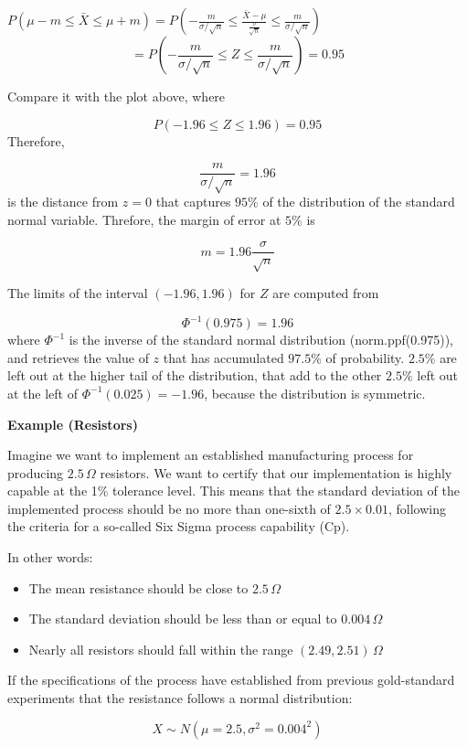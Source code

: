 \documentclass[
]{book}
\providecommand{\tightlist}{%
  \setlength{\itemsep}{0pt}\setlength{\parskip}{0pt}}
\begin{document}
\(P(\mu-m \leq \bar{X} \leq\mu + m)=P(-\frac{m}{\sigma/\sqrt{n}} \leq \frac{\bar{X}-\mu}{\frac{\sigma}{\sqrt{n}}}\leq\frac{m}{\sigma/\sqrt{n}})\)
\[=P(-\frac{m}{\sigma/\sqrt{n}} \leq Z \leq\frac{m}{\sigma/\sqrt{n}})=0.95\]

Compare it with the plot above, where

\[P(-1.96 \leq Z \leq 1.96)=0.95\]
Therefore,

\[\frac{m}{\sigma/\sqrt{n}}=1.96\]
is the distance from \(z=0\) that captures \(95\%\) of the distribution of the standard normal variable. Threfore, the margin of error at \(5\%\) is

\[m=1.96\frac{\sigma}{\sqrt{n}}\]

The limits of the interval \((-1.96, 1.96)\) for \(Z\) are computed from

\[\Phi^{-1}(0.975)=1.96\]
where \(\Phi^{-1}\) is the inverse of the standard normal distribution (norm.ppf(0.975)), and retrieves the value of \(z\) that has accumulated \(97.5\%\) of probability. \(2.5\%\) are left out at the higher tail of the distribution, that add to the other \(2.5\%\) left out at the left of \(\Phi^{-1}(0.025)=-1.96\), because the distribution is symmetric.

\textbf{Example (Resistors)}

Imagine we want to implement an established manufacturing process for producing \(2.5\,\Omega\) resistors. We want to certify that our implementation is highly capable at the 1\% tolerance level. This means that the standard deviation of the implemented process should be no more than one-sixth of \(2.5 \times 0.01\), following the criteria for a so-called Six Sigma process capability (Cp).

In other words:

\begin{itemize}
\tightlist
\item
  The mean resistance should be close to \(2.5\,\Omega\)
\item
  The standard deviation should be less than or equal to \(0.004\,\Omega\)
\item
  Nearly all resistors should fall within the range \((2.49, 2.51)\,\Omega\)
\end{itemize}

If the specifications of the process have established from previous gold-standard experiments that the resistance follows a normal distribution:

\[
X \sim N(\mu = 2.5, \sigma^2 = 0.004^2)
\]
\end{document}
